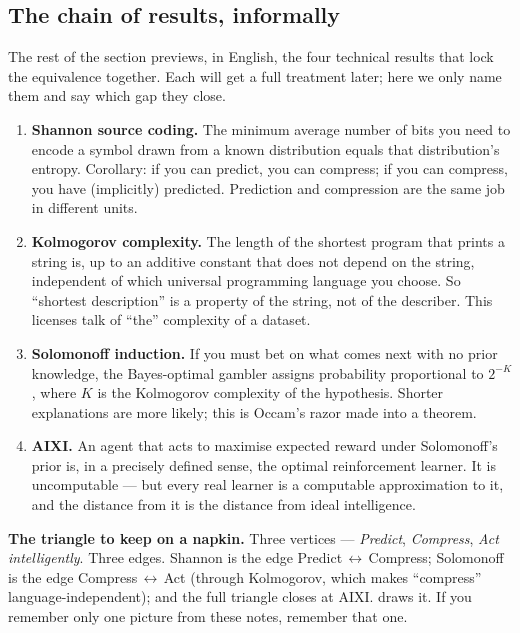 \documentclass[12pt,a4paper]{article}
\theoremstyle{plain}
\theoremstyle{definition}
\begin{document}
\subsection*{The chain of results, informally}

The rest of the section previews, in English, the four technical
results that lock the equivalence together. Each will get a full
treatment later; here we only name them and say which gap they
close.

\begin{enumerate}[leftmargin=1.4em]
  \item \textbf{Shannon source coding.} The minimum average number
  of bits you need to encode a symbol drawn from a known
  distribution equals that distribution's entropy. Corollary: if
  you can predict, you can compress; if you can compress, you have
  (implicitly) predicted. Prediction and compression are the same
  job in different units.
  \item \textbf{Kolmogorov complexity.} The length of the shortest
  program that prints a string is, up to an additive constant that
  does not depend on the string, independent of which universal
  programming language you choose. So ``shortest description'' is
  a property of the string, not of the describer. This licenses
  talk of ``the'' complexity of a dataset.
  \item \textbf{Solomonoff induction.} If you must bet on what
  comes next with no prior knowledge, the Bayes-optimal gambler
  assigns probability proportional to $2^{-K}$, where $K$ is the
  Kolmogorov complexity of the hypothesis. Shorter explanations
  are more likely; this is Occam's razor made into a theorem.
  \item \textbf{AIXI.} An agent that acts to maximise expected
  reward under Solomonoff's prior is, in a precisely defined
  sense, the optimal reinforcement learner. It is uncomputable ---
  but every real learner is a computable approximation to it, and
  the distance from it is the distance from ideal intelligence.
\end{enumerate}

\begin{intuition}
\textbf{The triangle to keep on a napkin.} Three vertices ---
\emph{Predict}, \emph{Compress}, \emph{Act intelligently}. Three
edges. Shannon is the edge Predict\,$\leftrightarrow$\,Compress;
Solomonoff is the edge Compress\,$\leftrightarrow$\,Act (through
Kolmogorov, which makes ``compress'' language-independent); and the
full triangle closes at AIXI.  draws it. If you
remember only one picture from these notes, remember that one.
\end{intuition}
\end{document}
